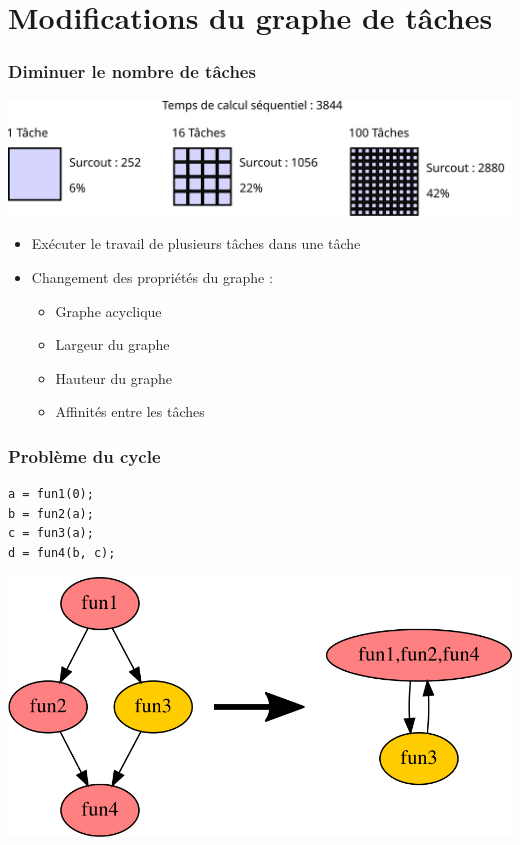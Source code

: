 \documentclass{beamer}
\begin{document}
\section[Modifications graphe]{Modifications du graphe de tâches}
\begin{frame}
  \frametitle{Diminuer le nombre de tâches}

  \centerline{\includegraphics[width=\linewidth]{overhead}}


  \begin{itemize}
    \item<1-> Exécuter le travail de plusieurs tâches dans une tâche
    \item<2-> Changement des propriétés du graphe :
      \begin{itemize}
        \item<2-> Graphe acyclique
        \item<2-> Largeur du graphe
        \item<2-> Hauteur du graphe
        \item<2-> Affinités entre les tâches
      \end{itemize}
  \end{itemize}

\end{frame}


\begin{frame}[fragile]
  \frametitle{Problème du cycle}

\begin{lstlisting}
a = fun1(0);
b = fun2(a);
c = fun3(a);
d = fun4(b, c);
\end{lstlisting}

  \centerline{\includegraphics[width=0.8\linewidth]{agg_invalid}}
\end{frame}
\end{document}
